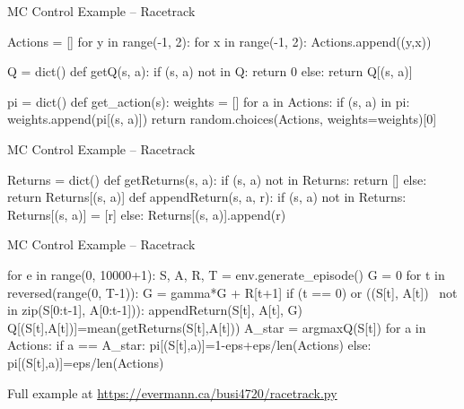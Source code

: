 \documentclass[ignorenonframetext,xcolor=x11names]{beamer}
\begin{document}
\begin{frame}[fragile]{MC Control Example -- Racetrack}
\begin{pythoncode}
Actions = []
for y in range(-1, 2):
    for x in range(-1, 2):
        Actions.append((y,x))

Q = dict()
def getQ(s, a):
    if (s, a) not in Q:
        return 0
    else:
        return Q[(s, a)]

pi = dict()
def get_action(s):
    weights = []
    for a in Actions:
        if (s, a) in pi:
            weights.append(pi[(s, a)])
    return random.choices(Actions, weights=weights)[0]
\end{pythoncode}
\end{frame}

\begin{frame}[fragile]{MC Control Example -- Racetrack}
\begin{pythoncode}
Returns = dict()
def getReturns(s, a):
    if (s, a) not in Returns:
        return []
    else:
        return Returns[(s, a)]
def appendReturn(s, a, r):
    if (s, a) not in Returns:
        Returns[(s, a)] = [r]
    else:
        Returns[(s, a)].append(r)
\end{pythoncode}
\end{frame}

\begin{frame}[fragile]{MC Control Example -- Racetrack}
\begin{pythoncode}
for e in range(0, 10000+1):
    S, A, R, T = env.generate_episode()
    G = 0
    for t in reversed(range(0, T-1)):
        G = gamma*G + R[t+1]
        if (t == 0) or ((S[t], A[t]) \
                not in zip(S[0:t-1], A[0:t-1])):
            appendReturn(S[t], A[t], G)
            Q[(S[t],A[t])]=mean(getReturns(S[t],A[t]))
            A_star = argmaxQ(S[t])
            for a in Actions:
                if a == A_star:
                    pi[(S[t],a)]=1-eps+eps/len(Actions)
                else:
                    pi[(S[t],a)]=eps/len(Actions)
\end{pythoncode}

Full example at \url{https://evermann.ca/busi4720/racetrack.py}
\end{frame}
\end{document}
